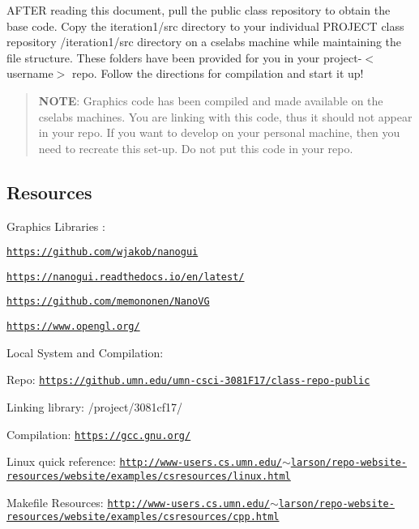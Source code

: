 A\+F\+T\+ER reading this document, pull the public class repository to obtain the base code. Copy the iteration1/src directory to your individual P\+R\+O\+J\+E\+CT class repository /iteration1/src directory on a cselabs machine while maintaining the file structure. These folders have been provided for you in your {\ttfamily project-\/$<$username$>$} repo. Follow the directions for compilation and start it up!

\begin{quote}
{\bfseries N\+O\+TE}\+: Graphics code has been compiled and made available on the cselabs machines. You are linking with this code, thus it should not appear in your repo. If you want to develop on your personal machine, then you need to recreate this set-\/up. Do not put this code in your repo. \end{quote}






\subsection*{Resources}

Graphics Libraries \+:
\begin{DoxyItemize}
\item \href{https://github.com/wjakob/nanogui}{\tt https\+://github.\+com/wjakob/nanogui}
\item \href{https://nanogui.readthedocs.io/en/latest/}{\tt https\+://nanogui.\+readthedocs.\+io/en/latest/}
\item \href{https://github.com/memononen/NanoVG}{\tt https\+://github.\+com/memononen/\+Nano\+VG}
\item \href{https://www.opengl.org/}{\tt https\+://www.\+opengl.\+org/}
\end{DoxyItemize}

Local System and Compilation\+:
\begin{DoxyItemize}
\item Repo\+: \href{https://github.umn.edu/umn-csci-3081F17/class-repo-public}{\tt https\+://github.\+umn.\+edu/umn-\/csci-\/3081\+F17/class-\/repo-\/public}
\item Linking library\+: {\ttfamily /project/3081cf17/}
\item Compilation\+: \href{https://gcc.gnu.org/}{\tt https\+://gcc.\+gnu.\+org/}
\item Linux quick reference\+: \href{http://www-users.cs.umn.edu/~larson/repo-website-resources/website/examples/csresources/linux.html}{\tt http\+://www-\/users.\+cs.\+umn.\+edu/$\sim$larson/repo-\/website-\/resources/website/examples/csresources/linux.\+html}
\item Makefile Resources\+: \href{http://www-users.cs.umn.edu/~larson/repo-website-resources/website/examples/csresources/cpp.html}{\tt http\+://www-\/users.\+cs.\+umn.\+edu/$\sim$larson/repo-\/website-\/resources/website/examples/csresources/cpp.\+html}
\end{DoxyItemize}

